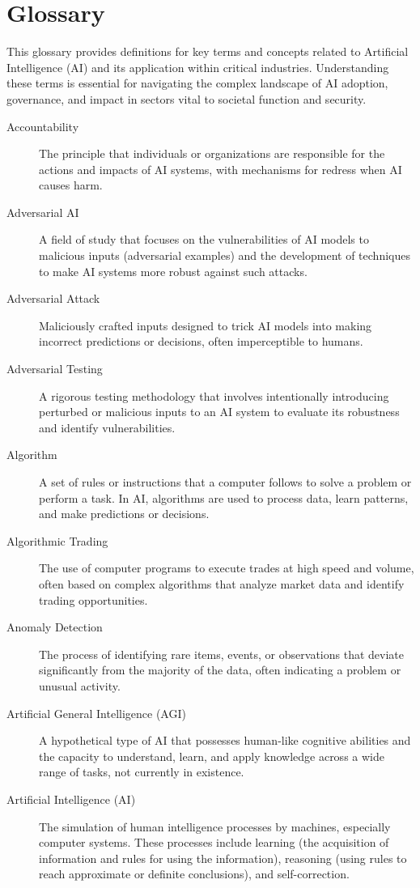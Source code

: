 \chapter{Glossary}
\label{chap:glossary}

This glossary provides definitions for key terms and concepts related to Artificial Intelligence (AI) and its application within critical industries. Understanding these terms is essential for navigating the complex landscape of AI adoption, governance, and impact in sectors vital to societal function and security.

\begin{description}
    \item[Accountability] The principle that individuals or organizations are responsible for the actions and impacts of AI systems, with mechanisms for redress when AI causes harm.
    \item[Adversarial AI] A field of study that focuses on the vulnerabilities of AI models to malicious inputs (adversarial examples) and the development of techniques to make AI systems more robust against such attacks.
    \item[Adversarial Attack] Maliciously crafted inputs designed to trick AI models into making incorrect predictions or decisions, often imperceptible to humans.
    \item[Adversarial Testing] A rigorous testing methodology that involves intentionally introducing perturbed or malicious inputs to an AI system to evaluate its robustness and identify vulnerabilities.
    \item[Algorithm] A set of rules or instructions that a computer follows to solve a problem or perform a task. In AI, algorithms are used to process data, learn patterns, and make predictions or decisions.
    \item[Algorithmic Trading] The use of computer programs to execute trades at high speed and volume, often based on complex algorithms that analyze market data and identify trading opportunities.
    \item[Anomaly Detection] The process of identifying rare items, events, or observations that deviate significantly from the majority of the data, often indicating a problem or unusual activity.
    \item[Artificial General Intelligence (AGI)] A hypothetical type of AI that possesses human-like cognitive abilities and the capacity to understand, learn, and apply knowledge across a wide range of tasks, not currently in existence.
    \item[Artificial Intelligence (AI)] The simulation of human intelligence processes by machines, especially computer systems. These processes include learning (the acquisition of information and rules for using the information), reasoning (using rules to reach approximate or definite conclusions), and self-correction.

\end{description}
